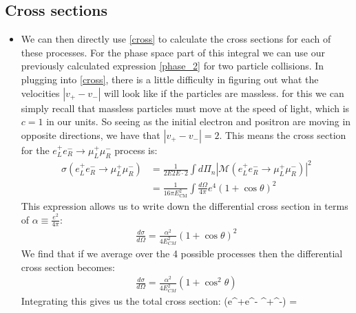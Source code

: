 \documentclass[11pt]{article}
\numberwithin{equation}{section}
\renewenvironment{flalign}{\vspace{-3mm}\empheq[box=\tcbhighmath]{align}}{\endempheq}
\begin{document}
\subsection{Cross sections} %
\label{sub:cross_sections}
\begin{itemize}
    \item We can then directly use \ref{cross} to calculate the cross sections for each of these processes. For the phase space part of this integral we can use our previously calculated expression \ref{phase_2} for two particle collisions. In plugging into \ref{cross}, there is a little difficulty in figuring out what the velocities $|v_+-v_-|$ will look like if the particles are massless. for this we can simply recall that massless particles must move at the speed of light, which is $c=1$ in our units. So seeing as the initial electron and positron are moving in opposite directions, we have that $|v_+-v_-| =2$. This means the cross section for the $e_L^+e_R^- \rightarrow \mu_L^+\mu_R^-$ process is:
    \begin{align*}
        \sigma(e_L^+e_R^- \rightarrow \mu_L^+\mu_R^-) &= \frac{1}{2E2E \cdot 2}\int d\Pi_n|\mathcal{M}(e_L^+e_R^- \rightarrow \mu_L^+\mu_R^-)|^2 \\
        & = \frac{1}{16\pi E_{\text{CM}}^2}\int \frac{d \Omega}{4\pi} e^4(1+\cos \theta)^2
    \end{align*}
    This expression allows us to write down the differential cross section in terms of $\alpha \equiv \frac{e^2}{4\pi}$:
    \begin{align*}
         \frac{d \sigma}{d\Omega} =\frac{\alpha^2}{4E_{CM}^2}(1+\cos \theta)^2
     \end{align*}
     We find that if we average over the 4 possible processes then the differential cross section becomes:
     \begin{align*}
          \frac{d \sigma}{d\Omega} =\frac{\alpha^2}{4E_{CM}^2}(1+\cos^2 \theta)
      \end{align*} 
      Integrating this gives us the total cross section:
      \begin{flalign}
          \sigma(e^+e^- \rightarrow \mu^+\mu^-) = 
      \end{flalign}
\end{itemize}
\end{document}
